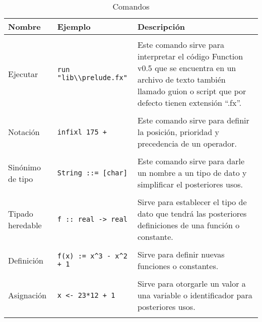       \begin{longtable}[c]{lll}
         \caption{Comandos}\label{tb:commands} \\ \hline
         {\bf Nombre} & {\bf Ejemplo} & {\bf Descripción} \\ \hline &&\\
         Ejecutar & \texttt{run "lib\textbackslash\textbackslash prelude.fx"} &
         \begin{minipage}{7cm}
            Este comando sirve para interpretar el código Function v0.5 que se encuentra en un archivo de texto también llamado guion o script que por defecto tienen extensión ``.fx''.
         \end{minipage} \\ &&\\
         Notación & \texttt{infixl 175 +} &
         \begin{minipage}{7cm}
            Este comando sirve para definir la posición, prioridad y precedencia de un operador.
         \end{minipage}\\ &&\\
         Sinónimo de tipo & \texttt{String ::= [char]} &
         \begin{minipage}{7cm}
            Este comando sirve para darle un nombre a un tipo de dato y simplificar el posteriores usos.
         \end{minipage}\\ &&\\
         Tipado heredable & \texttt{f :: real -> real} &
         \begin{minipage}{7cm}
            Sirve para establecer el tipo de dato que tendrá las posteriores definiciones de una función o constante.
         \end{minipage}\\ &&\\
         Definición & \texttt{f(x) := x\^{}3 - x\^{}2 + 1} &
         \begin{minipage}{7cm}
            Sirve para definir nuevas funciones o constantes.
         \end{minipage}\\ &&\\
         Asignación & \texttt{x <- 23*12 + 1} &
         \begin{minipage}{7cm}
            Sirve para otorgarle un valor a una variable o identificador para posteriores usos.
         \end{minipage}\\ &&\\

\end{longtable}
